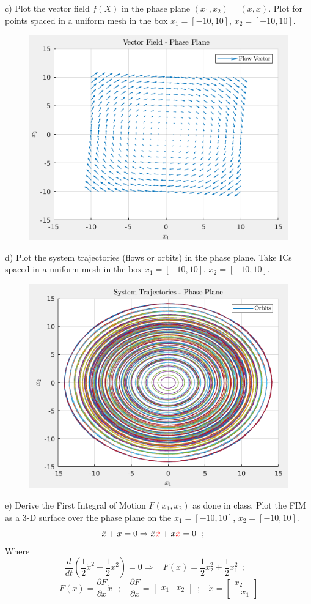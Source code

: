 \documentclass{homeworg}
\begin{document}
c) Plot the vector field \(f(X)\) in the phase plane \((x_1, x_2)=(x, \dot{x})\). Plot for points spaced in a uniform mesh in the box \(x_1=[-10,10]\), \(x_2=[-10,10]\).
\begin{figure}[h]
  \includegraphics[width=.45\textwidth]{fig02.png}
  \centering
\end{figure}

d) Plot the system trajectories (flows or orbits) in the phase plane. Take ICs spaced in a uniform mesh in the box \(x_1=[-10,10]\), \(x_2=[-10,10]\).
\begin{figure}[h]
  \includegraphics[width=.45\textwidth]{fig03.png}
  \centering
\end{figure}
\newpage
e) Derive the First Integral of Motion \(F(x_1,x_2)\) as done in class. Plot the FIM as a 3-D surface over the phase plane on the \(x_1=[-10,10]\), \(x_2=[-10,10]\).
\begin{equation*}
  \ddot{x} + x = 0 \Rightarrow \ddot{x} \textcolor{red}{\dot{x}} + x \textcolor{red}{\dot{x}} = 0 ~~;~~~~
\end{equation*}
Where
\begin{equation*}
  \frac{d}{dt}\left( \frac{1}{2} \dot{x}^2 +  \frac{1}{2} x^2 \right) = 0 \Rightarrow ~~~~ F(x) = \frac{1}{2} x_2^2 +  \frac{1}{2} x^2_1 ~~;~~~~
\end{equation*}
\begin{equation*}
\dot{F}(x) = \frac{\partial F}{\partial x} \dot{x}~~~;~~~~ \frac{\partial F}{\partial x} =
\begin{bmatrix}
  x_1 & x_2
\end{bmatrix}~~;~~~~
\dot{x} =
\begin{bmatrix}
  x_2 \\
  -x_1
\end{bmatrix}
\end{equation*}
\end{document}
